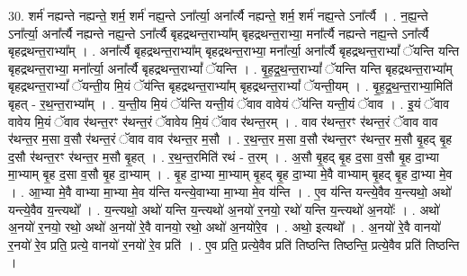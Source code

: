 \documentclass[17pt]{extarticle}
\begin{document}
30. शर्म॑ नह्यन्ते नह्यन्ते॒ शर्म॒ शर्म॑ नह्य॒न्ते ऽना᳚र्त्या॒ अना᳚र्त्यै नह्यन्ते॒ शर्म॒ शर्म॑ नह्य॒न्ते ऽना᳚र्त्यै । . न॒ह्य॒न्ते ऽना᳚र्त्या॒ अना᳚र्त्यै नह्यन्ते नह्य॒न्ते ऽना᳚र्त्यै बृहद्रथन्त॒राभ्या᳚म् बृहद्रथन्त॒राभ्या॒ मना᳚र्त्यै नह्यन्ते नह्य॒न्ते ऽना᳚र्त्यै बृहद्रथन्त॒राभ्या᳚म् । . अना᳚र्त्यै बृहद्रथन्त॒राभ्या᳚म् बृहद्रथन्त॒राभ्या॒ मना᳚र्त्या॒ अना᳚र्त्यै बृहद्रथन्त॒राभ्यां᳚ ॅयन्ति यन्ति बृहद्रथन्त॒राभ्या॒ मना᳚र्त्या॒ अना᳚र्त्यै बृहद्रथन्त॒राभ्यां᳚ ॅयन्ति । . बृ॒ह॒द्र॒थ॒न्त॒राभ्यां᳚ ॅयन्ति यन्ति बृहद्रथन्त॒राभ्या᳚म् बृहद्रथन्त॒राभ्यां᳚ ॅयन्ती॒य मि॒यं ॅय॑न्ति बृहद्रथन्त॒राभ्या᳚म् बृहद्रथन्त॒राभ्यां᳚ ॅयन्ती॒यम् । . बृ॒ह॒द्र॒थ॒न्त॒राभ्या॒मिति॑ बृहत् - र॒थ॒न्त॒राभ्या᳚म् । . य॒न्ती॒य मि॒यं ॅय॑न्ति यन्ती॒यं ॅवाव वावेयं ॅय॑न्ति यन्ती॒यं ॅवाव । . इ॒यं ॅवाव वावेय मि॒यं ॅवाव र॑थन्त॒रꣳ र॑थन्त॒रं ॅवावेय मि॒यं ॅवाव र॑थन्त॒रम् । . वाव र॑थन्त॒रꣳ र॑थन्त॒रं ॅवाव वाव र॑थन्त॒र म॒सा व॒सौ र॑थन्त॒रं ॅवाव वाव र॑थन्त॒र म॒सौ । . र॒थ॒न्त॒र म॒सा व॒सौ र॑थन्त॒रꣳ र॑थन्त॒र म॒सौ बृ॒हद् बृ॒ह द॒सौ र॑थन्त॒रꣳ र॑थन्त॒र म॒सौ बृ॒हत् । . र॒थ॒न्त॒रमिति॑ रथं - त॒रम् । . अ॒सौ बृ॒हद् बृ॒ह द॒सा व॒सौ बृ॒ह दा॒भ्या मा॒भ्याम् बृ॒ह द॒सा व॒सौ बृ॒ह दा॒भ्याम् । . बृ॒ह दा॒भ्या मा॒भ्याम् बृ॒हद् बृ॒ह दा॒भ्या मे॒वै वाभ्याम् बृ॒हद् बृ॒ह दा॒भ्या मे॒व । . आ॒भ्या मे॒वै वाभ्या मा॒भ्या मे॒व य॑न्ति यन्त्ये॒वाभ्या मा॒भ्या मे॒व य॑न्ति । . ए॒व य॑न्ति यन्त्ये॒वैव य॒न्त्यथो॒ अथो॑ यन्त्ये॒वैव य॒न्त्यथो᳚ । . य॒न्त्यथो॒ अथो॑ यन्ति य॒न्त्यथो॑ अ॒नयो॑ र॒नयो॒ रथो॑ यन्ति य॒न्त्यथो॑ अ॒नयोः᳚ । . अथो॑ अ॒नयो॑ र॒नयो॒ रथो॒ अथो॑ अ॒नयो॑ रे॒वै वानयो॒ रथो॒ अथो॑ अ॒नयो॑रे॒व । . अथो॒ इत्यथो᳚ । . अ॒नयो॑ रे॒वै वानयो॑ र॒नयो॑ रे॒व प्रति॒ प्रत्ये॒ वानयो॑ र॒नयो॑ रे॒व प्रति॑ । . ए॒व प्रति॒ प्रत्ये॒वैव प्रति॑ तिष्ठन्ति तिष्ठन्ति॒ प्रत्ये॒वैव प्रति॑ तिष्ठन्ति । \newline
\end{document}
